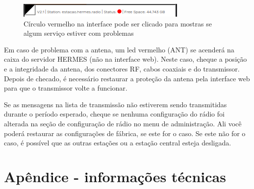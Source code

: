 \documentclass[11pt,a4paper]{article}
\begin{document}

\begin{figure}[H]
    \centering
    \includegraphics[width=0.8\columnwidth]{screenshots/frontend/en/status.png}
    	\caption{Círculo vermelho na interface pode ser clicado para mostras se algum serviço estiver com problemas}
    \label{fig:status}
\end{figure}

Em caso de problema com a antena, um led vermelho (ANT) se acenderá na caixa do servidor HERMES (não na interface web). Neste caso, cheque a posição e a integridade da antena, dos conectores RF, cabos coaxiais e do transmissor. Depois de checado, é necessário restaurar a proteção da antena pela interface web para que o transmissor volte a funcionar.


Se as mensagens na lista de transmissão não estiverem sendo transmitidas durante o período esperado, cheque se nenhuma configuração do rádio foi alterada na seção de configuração de rádio no menu de administração. Ali você poderá restaurar as configurações de fábrica, se este for o caso. Se este não for o caso, é possível que as outras estações ou a estação central esteja desligada.




\pagebreak
{}
\label{techinfo}
\section{Apêndice - informações técnicas}
\end{document}
